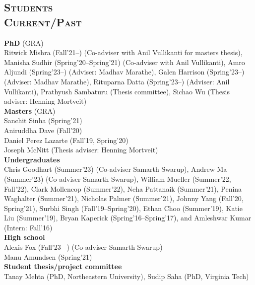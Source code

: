 \documentclass[margin,10pt]{res} %
\begin{document}
\begin{resume}
{\section{\textnormal{\textsc{Students \\Current/Past}}}
\noindent\textbf{PhD} (GRA)\\
Ritwick Mishra (Fall'21--) (Co-adviser with Anil
Vullikanti for masters thesis),
Manisha Sudhir (Spring'20--Spring'21) (Co-adviser with Anil
Vullikanti),
Amro Aljundi (Spring'23--) (Adviser: Madhav Marathe),
Galen Harrison (Spring'23--) (Adviser: Madhav Marathe),
Rituparna Datta (Spring'23--) (Adviser: Anil Vullikanti),
Prathyush Sambaturu (Thesis committee),
Sichao Wu (Thesis adviser: Henning Mortveit)\vspace{.2cm}\\
\noindent\textbf{Masters} (GRA)\\
Sanchit Sinha (Spring'21)\\
Aniruddha Dave (Fall'20)\\
Daniel Perez Lazarte (Fall'19, Spring'20)\\
Joseph McNitt (Thesis adviser: Henning Mortveit)\vspace{.2cm}\\
\noindent\textbf{Undergraduates}\\
Chris Goodhart (Summer'23) (Co-adviser Samarth Swarup),
Andrew Ma (Summer'23) (Co-adviser Samarth Swarup),
William Mueller (Summer'22, Fall'22),
Clark Mollencop (Summer'22),
Neha Pattanaik (Summer'21),
Penina Waghalter (Summer'21),
Nicholas Palmer (Summer'21),
Johnny Yang (Fall'20, Spring'21),
Surbhi Singh (Fall'19--Spring'20),
Ethan Choo (Summer'19),
Katie Liu (Summer'19),
Bryan Kaperick (Spring'16--Spring'17), and
Amleshwar Kumar (Intern: Fall'16) \vspace{.2cm}\\
\noindent\textbf{High school}\\
Alexis Fox (Fall'23 --) (Co-adviser Samarth Swarup) \\
Manu Amundsen (Spring'21)\vspace{.2cm}\\
\noindent\textbf{Student thesis/project committee}\\
Tanay Mehta (PhD, Northeastern University),
Sudip Saha (PhD, Virginia Tech)
}
\end{resume}
\end{document}
